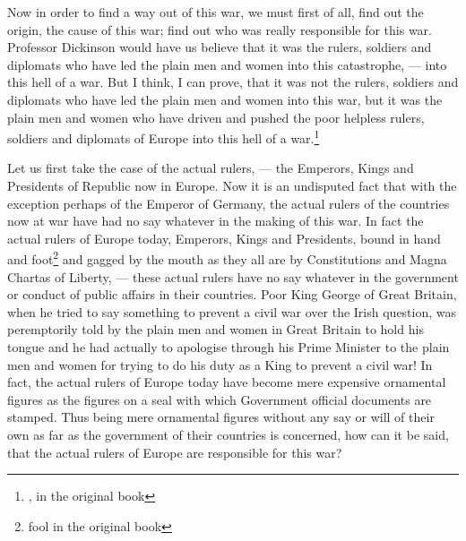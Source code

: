 Now in order to find a way out of this war, we must first of all, find out the origin, the cause of this war; find out who was really responsible for this war.
Professor Dickinson would have us believe that it was the rulers, soldiers and diplomats who have led the plain men and women into this catastrophe, --- into this hell of a war.
But I think, I can prove, that it was not the rulers, soldiers and diplomats who have led the plain men and women into this war, but it was the plain men and women who have driven and pushed the poor helpless rulers, soldiers and diplomats of Europe into this hell of a war.\footnote{, in the original book}

Let us first take the case of the actual rulers, --- the Emperors, Kings and Presidents of Republic now in Europe.
Now it is an undisputed fact that with the exception perhaps of the Emperor of Germany, the actual rulers of the countries now at war have had no say whatever in the making of this war.
In fact the actual rulers of Europe today, Emperors, Kings and Presidents, bound in hand and foot\footnote{fool in the original book} and gagged by the mouth as they all are by Constitutions and Magna Chartas of Liberty, --- these actual rulers have no say whatever in the government or conduct of public affairs in their countries.
Poor King George of Great Britain, when he tried to say something to prevent a civil war over the Irish question, was peremptorily told by the plain men and women in Great Britain to hold his tongue and he had actually to apologise through his Prime Minister to the plain men and women for trying to do his duty as a King to prevent a civil war! 
In fact, the actual rulers of Europe today have become mere expensive ornamental figures as the figures on a seal with which Government official documents are stamped.
Thus being mere ornamental figures without any say or will of their own as far as the government of their countries is concerned, how can it be said, that the actual rulers of Europe are responsible for this war?

